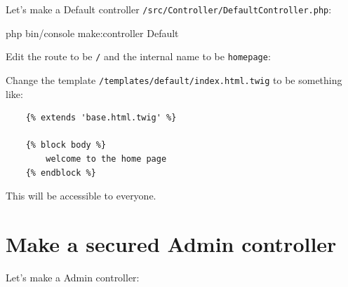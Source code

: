 \documentclass[a4paperpaper,openright]{book}
\newenvironment{Shaded}{}{}
\newcommand{\AnnotationTok}[1]{\textcolor[rgb]{0.38,0.63,0.69}{\textbf{\textit{#1}}}}
\newcommand{\CommentTok}[1]{\textcolor[rgb]{0.38,0.63,0.69}{\textit{#1}}}
\newcommand{\ExtensionTok}[1]{#1}
\newcommand{\KeywordTok}[1]{\textcolor[rgb]{0.00,0.44,0.13}{\textbf{#1}}}
\newcommand{\NormalTok}[1]{#1}
\newcommand{\OtherTok}[1]{\textcolor[rgb]{0.00,0.44,0.13}{#1}}
\newcommand{\StringTok}[1]{\textcolor[rgb]{0.25,0.44,0.63}{#1}}
\begin{document}
Let's make a Default controller
\texttt{/src/Controller/DefaultController.php}:

\begin{Shaded}
\begin{Highlighting}[]
    \ExtensionTok{php}\NormalTok{ bin/console make:controller Default}
\end{Highlighting}
\end{Shaded}

Edit the route to be \texttt{/} and the internal name to be
\texttt{homepage}:

\begin{Shaded}
\end{Shaded}

Change the template \texttt{/templates/default/index.html.twig} to be
something like:

\begin{verbatim}
    {% extends 'base.html.twig' %}

    {% block body %}
        welcome to the home page
    {% endblock %}
\end{verbatim}

This will be accessible to everyone.

\hypertarget{make-a-secured-admin-controller}{%
\section{Make a secured Admin
controller}\label{make-a-secured-admin-controller}}

Let's make a Admin controller:

\begin{Shaded}
\end{Shaded}
\end{document}

